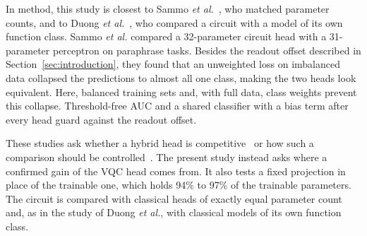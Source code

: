 \documentclass{ieeeaccess}
\newcommand{\vqc}{VQC}
\begin{document}
In method, this study is closest to Sammo \emph{et al.}~\cite{sammo2026}, who matched parameter counts, and to Duong \emph{et al.}~\cite{duong2026}, who compared a circuit with a model of its own function class. Sammo \emph{et al.} compared a 32-parameter circuit head with a 31-parameter perceptron on paraphrase tasks. Besides the readout offset described in Section~\ref{sec:introduction}, they found that an unweighted loss on imbalanced data collapsed the predictions to almost all one class, making the two heads look equivalent. Here, balanced training sets and, with full data, class weights prevent this collapse. Threshold-free AUC and a shared classifier with a bias term after every head guard against the readout offset.

These studies ask whether a hybrid head is competitive~\cite{freinberger2026,fulton2026,duong2026} or how such a comparison should be controlled~\cite{sammo2026}. The present study instead asks where a confirmed gain of the \vqc{} head comes from. It also tests a fixed projection in place of the trainable one, which holds 94\% to 97\% of the trainable parameters. The circuit is compared with classical heads of exactly equal parameter count and, as in the study of Duong \emph{et al.}, with classical models of its own function class.
\end{document}
